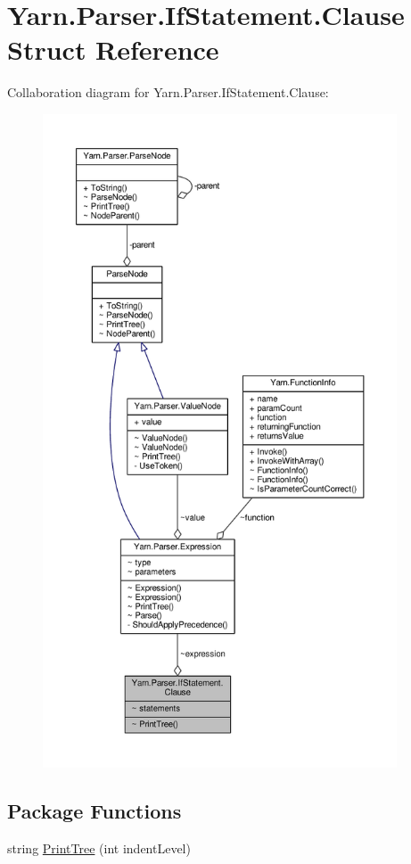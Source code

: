 \hypertarget{a00039}{\section{Yarn.\-Parser.\-If\-Statement.\-Clause Struct Reference}
\label{a00039}
}


Collaboration diagram for Yarn.\-Parser.\-If\-Statement.\-Clause\-:
\nopagebreak
\begin{figure}[H]
\begin{center}
\leavevmode
\includegraphics[height=550pt]{a00291}
\end{center}
\end{figure}
\subsection*{Package Functions}
\begin{DoxyCompactItemize}
\item 
string \hyperlink{a00039_a7f4fc9399896512b68fdc7bc7cf818c9}{Print\-Tree} (int indent\-Level)
\end{DoxyCompactItemize}
